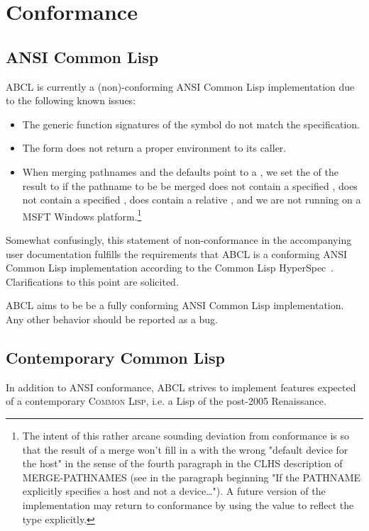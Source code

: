 \documentclass[10pt]{book}
\begin{document}
\section{Conformance}
\label{section:conformance}

\subsection{ANSI Common Lisp}
\textsc{ABCL} is currently a (non)-conforming \textsc{ANSI} Common Lisp
implementation due to the following known issues:

\begin{itemize}
\item The generic function signatures of the  symbol
  do not match the specification.
\item The  form does not return a proper 
  environment to its caller.
\item When merging pathnames and the defaults point to a ,
  we set the  of the result to  if the pathname to be
  be merged does not contain a specified , does not contain a
  specified , does contain a relative , and we are
  not running on a \textsc{MSFT} Windows platform.\footnote{The intent of this
    rather arcane sounding deviation from conformance is so that the
    result of a merge won't fill in a  with the wrong "default
    device for the host" in the sense of the fourth paragraph in the
    \textsc{CLHS} description of MERGE-PATHNAMES (see in \cite{CLHS} the paragraph beginning
    "If the PATHNAME explicitly specifies a host and not a device…").
    A future version of the implementation may return to conformance
    by using the  value to reflect the type explicitly.
  }

\end{itemize}

Somewhat confusingly, this statement of non-conformance in the
accompanying user documentation fulfills the requirements that
\textsc{ABCL} is a conforming ANSI Common Lisp implementation according
to the Common Lisp HyperSpec~\cite{CLHS}.  Clarifications to this point
are solicited.

\textsc{ABCL} aims to be be a fully conforming \textsc{ANSI} Common Lisp implementation.
Any other behavior should be reported as a bug.

\subsection{Contemporary Common Lisp}
In addition to \textsc{ANSI} conformance, \textsc{ABCL} strives to implement
features expected of a contemporary \textsc{Common Lisp}, i.e. a Lisp of the
post-2005 Renaissance.
\end{document}

